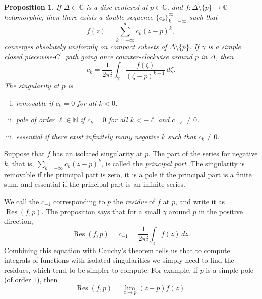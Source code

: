 \documentclass[12pt,openany]{book}
\newcommand{\C}{{\mathbb{C}}}
\newcommand{\N}{{\mathbb{N}}}
\newcommand{\myindex}[1]{#1\index{#1}}
\theoremstyle{plain}
\newtheorem{prop}[thm]{Proposition}
\theoremstyle{remark}
\theoremstyle{definition}
\theoremstyle{exercise}
\theoremstyle{example}
\begin{document}
\begin{prop}
If $\Delta \subset \C$ is a disc centered at $p \in \C$,
and $f \colon \Delta \setminus \{p\} \to \C$ holomorphic,
then there exists a double sequence $\{ c_{k} \}_{k = -\infty}^\infty$
such that
\begin{equation*}
f(z) = \sum_{k=-\infty}^\infty c_k {(z-p)}^k ,
\end{equation*}
converges absolutely uniformly on compact subsets of $\Delta \setminus \{p\}$.
If $\gamma$ is a simple closed piecewise-$C^1$ path
going once counter-clockwise around $p$ in $\Delta$, then
\begin{equation*}
c_k =
\frac{1}{2\pi i}
\int_{\gamma}
\frac{f(\zeta)}{{(\zeta-p)}^{k+1}}
\,
d \zeta  .
\end{equation*}
The singularity at $p$ is
\begin{enumerate}[(i)]
\item \emph{removable} if $c_k = 0$ for all $k < 0$.
\item \emph{pole} of order $\ell \in \N$ if $c_k = 0$ for all $k < -\ell$ and $c_{-\ell}
\neq 0$.
\item \emph{essential} if there exist infinitely many negative $k$
such that $c_k \neq 0$.
\end{enumerate}
\end{prop}

\pagebreak[3]
Suppose that $f$ has an isolated singularity at $p$.
The part of the series for negative $k$,
that is, 
$\sum_{k=-\infty}^{-1} c_k {(z-p)}^k$,
is called the \emph{\myindex{principal part}}.
The singularity is removable if the principal part is zero, it is a pole if
the principal part is a finite sum, and essential if the 
principal part is an infinite series.

We call the $c_{-1}$ corresponding to $p$
the \emph{\myindex{residue}} of $f$ at $p$, and write it
as $\operatorname{Res}(f,p)$.
The proposition says that for a small $\gamma$ around $p$ in the positive direction,
\begin{equation*}
\operatorname{Res}(f,p) = c_{-1} = \frac{1}{2\pi i} \int_\gamma f(z) \, dz
.
\end{equation*}
Combining this equation with Cauchy's theorem tells us that to compute
integrals of functions with isolated singularities we simply need to find
the residues,
which tend to be simpler to
compute.  For example, if $p$ is a simple pole (of order $1$), then
\begin{equation*}
\operatorname{Res}(f,p) = \lim_{z \to p} (z-p)f(z) .
\end{equation*}
\end{document}
